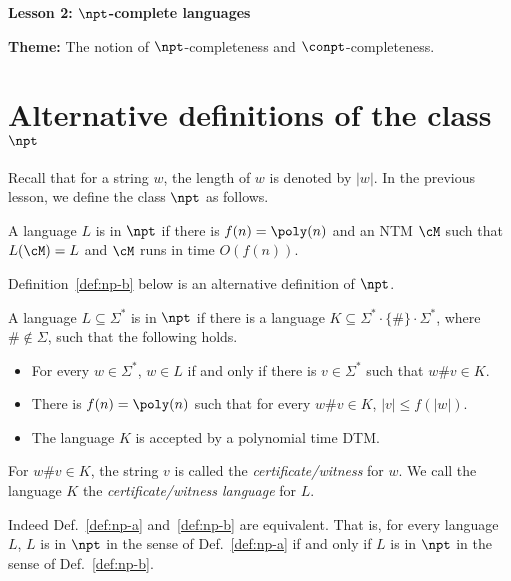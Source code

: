 \documentclass[11pt, a4paper]{article}
\renewcommand{\lesson}{2}
\renewcommand{\lessontitle}{$\npt$-complete languages}
\renewcommand{\fulltitle}{Lesson \lesson: \lessontitle}
\begin{document}
\date{}



\begin{center}
{\Large {\bf \fulltitle}}
\end{center}
\vspace{0.5cm}

\noindent
{\bf Theme:} The notion of $\npt$-completeness and $\conpt$-completeness.


\section{Alternative definitions of the class $\npt$}
\label{sec:def-np}


Recall that for a string $w$, the length of $w$ is denoted by $|w|$.
In the previous lesson, we define the class $\npt$ as follows.

\begin{definition}
\label{def:np-a}
A language $L$ is in $\npt$ if 
there is $f(n)=\poly(n)$ and an NTM $\cM$ such that $L(\cM)=L$ and 
$\cM$ runs in time $O(f(n))$.
\end{definition}

Definition~\ref{def:np-b} below is an alternative definition of $\npt$.

\begin{definition}
\label{def:np-b}
A language $L\subseteq \Sigma^*$ is in $\npt$ if
there is a language $K \subseteq \Sigma^*\cdot\{\#\}\cdot\Sigma^*$,
where $\#\notin \Sigma$, such that the following holds.
\begin{itemize}
\item
For every $w\in \Sigma^*$,
$w\in L$ if and only if there is $v\in\Sigma^*$ such that $w\# v\in K$.
\item
There is $f(n)=\poly(n)$ such that for every $w\# v \in K$,
$|v|\leq f(|w|)$.
\item
The language $K$ is accepted by a polynomial time DTM.
\end{itemize}
For $w\# v\in K$, the string $v$ is called the {\em certificate/witness} for $w$.
We call the language $K$ the {\em certificate/witness language} for $L$.
\end{definition}



Indeed Def.~\ref{def:np-a} and~\ref{def:np-b} are equivalent.
That is,
for every language $L$,
$L$ is in $\npt$ in the sense of Def.~\ref{def:np-a}
if and only if $L$ is in $\npt$ in the sense of Def.~\ref{def:np-b}.
\end{document}
